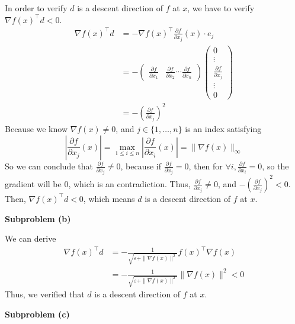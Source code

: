 \documentclass{article}
\begin{document}
In order to verify $d$ is a descent direction of $f$ at $x$, we have to verify $\nabla f(x)^{\top}d<0$.
\begin{equation}
	\begin{split}
		\nabla f(x)^{\top}d&=-\nabla f(x)^{\top}\frac{\partial f}{\partial x_{j}}(x) \cdot e_{j}\\
		&=-
		\begin{pmatrix}
			\frac{\partial f}{\partial x_{1}}&\frac{\partial f}{\partial x_{2}} \cdots \frac{\partial f}{\partial x_{n}}
		\end{pmatrix}
		\begin{pmatrix}
			0\\
			\vdots\\
			\frac{\partial f}{\partial x_{j}}\\
			\vdots\\
			0
		\end{pmatrix}\\
		&=-\left(\frac{\partial f}{\partial x_{j}}\right)^2
	\end{split}
\end{equation}
Because we know $\nabla f(x) \neq 0$, and $j \in\{1, \ldots, n\}$
is an index satisfying
	$$
		\left|\frac{\partial f}{\partial x_{j}}(x)\right|=\max _{1 \leq i \leq n}\left|\frac{\partial f}{\partial x_{i}}(x)\right|=\|\nabla f(x)\|_{\infty}
	$$
So we can conclude that $\frac{\partial f}{\partial x_{j}}\neq 0$, because if $\frac{\partial f}{\partial x_{j}}=0$, then for $\forall i, \frac{\partial f}{\partial x_{i}}= 0$, so the gradient will be 0, which is an contradiction. Thus, $\frac{\partial f}{\partial x_{j}}\neq 0$, and $-\left(\frac{\partial f}{\partial x_{j}}\right)^2 <0$. Then, $\nabla f(x)^{\top}d<0$, which means $d$ is a descent direction of $f$ at $x$.

\vspace{4pt}
\textbf{Subproblem (b)}

We can derive 
\begin{equation}
	\begin{split}
		\nabla f(x)^{\top}d&=-\frac{1}{\sqrt{\varepsilon+\|\nabla f(x)\|^{2}}}f(x)^{\top}\nabla f(x)\\
		&=-\frac{1}{\sqrt{\varepsilon+\|\nabla f(x)\|^{2}}}\|\nabla f(x)\|^{2}<0
	\end{split}
\end{equation}
Thus, we verified that $d$ is a descent direction of $f$ at $x$.
\pagebreak

\vspace{4pt}
\textbf{Subproblem (c)}
\end{document}
